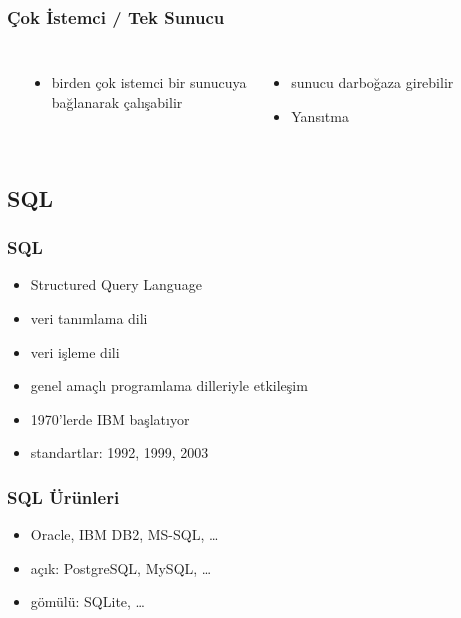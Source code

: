 \documentclass[dvipsnames]{beamer}
\theoremstyle{plain}
\begin{document}
\begin{frame}
  \frametitle{Çok İstemci / Tek Sunucu}

  \begin{columns}
    \begin{center}
    \end{center}

    \begin{itemize}
      \item birden çok istemci bir sunucuya\\
        bağlanarak çalışabilir
    \end{itemize}

    \bigskip
      \begin{itemize}
        \item sunucu darboğaza girebilir
        \item Yansıtma
      \end{itemize}
  \end{columns}
\end{frame}

\subsection{SQL}

\begin{frame}
  \frametitle{SQL}

  \begin{itemize}
    \item \alert{Structured Query Language}
    \item veri tanımlama dili
    \item veri işleme dili
    \item genel amaçlı programlama dilleriyle etkileşim

    \bigskip
    \item 1970'lerde IBM başlatıyor
    \item standartlar: 1992, 1999, 2003
  \end{itemize}
\end{frame}

\begin{frame}
  \frametitle{SQL Ürünleri}

  \begin{itemize}
    \item Oracle, IBM DB2, MS-SQL, \ldots
    \item açık: PostgreSQL, MySQL, \ldots 
    \item gömülü: SQLite, \ldots
  \end{itemize}
\end{frame}
\end{document}

